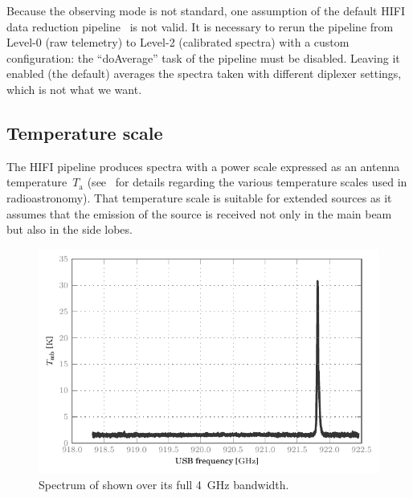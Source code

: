 Because the observing mode is not standard, one assumption of the default HIFI data reduction pipeline~\parencite{hifiobserversmanual} is not valid.
It is necessary to rerun the pipeline from Level-0 (raw telemetry) to Level-2 (calibrated spectra) with a custom configuration:
the ``doAverage'' task of the pipeline must be disabled.
Leaving it enabled (the default) averages the spectra taken with different diplexer settings, which is not what we want.




\subsection{Temperature scale}
The HIFI pipeline produces spectra with a power scale expressed as an antenna temperature~$T_\text{a}$
(see~\textcite{kutner1981recommendations} for details regarding the various temperature scales used in radioastronomy).
That temperature scale is suitable for extended sources as it assumes that the emission of the source is received not only in the main beam but also in the side lobes.

\begin{figure}
    \centering
    \includegraphics{87_00_00_tmb}
    \caption{
        Spectrum of  shown over its full \SI{4}{\giga\hertz} bandwidth.
    }
    \label{fig:co98_full_bandwidth}
\end{figure}


